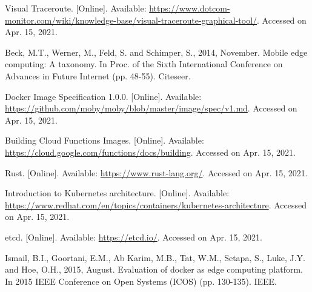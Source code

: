 \begin{thebibliography}{00}
 Visual Traceroute. [Online]. Available: \url{https://www.dotcom-monitor.com/wiki/knowledge-base/visual-traceroute-graphical-tool/}. Accessed on Apr. 15, 2021.

 Beck, M.T., Werner, M., Feld, S. and Schimper, S., 2014, November. Mobile edge computing: A taxonomy. In Proc. of the Sixth International Conference on Advances in Future Internet (pp. 48-55). Citeseer.

 Docker Image Specification 1.0.0. [Online]. Available: \url{https://github.com/moby/moby/blob/master/image/spec/v1.md}. Accessed on Apr. 15, 2021.

 Building Cloud Functions Images. [Online]. Available: \url{https://cloud.google.com/functions/docs/building}. Accessed on Apr. 15, 2021.

 Rust. [Online]. Available: \url{https://www.rust-lang.org/}. Accessed on Apr. 15, 2021.

 Introduction to Kubernetes architecture. [Online]. Available: \url{https://www.redhat.com/en/topics/containers/kubernetes-architecture}. Accessed on Apr. 15, 2021.

 etcd. [Online]. Available: \url{https://etcd.io/}. Accessed on Apr. 15, 2021.

 Ismail, B.I., Goortani, E.M., Ab Karim, M.B., Tat, W.M., Setapa, S., Luke, J.Y. and Hoe, O.H., 2015, August. Evaluation of docker as edge computing platform. In 2015 IEEE Conference on Open Systems (ICOS) (pp. 130-135). IEEE.

\end{thebibliography}
